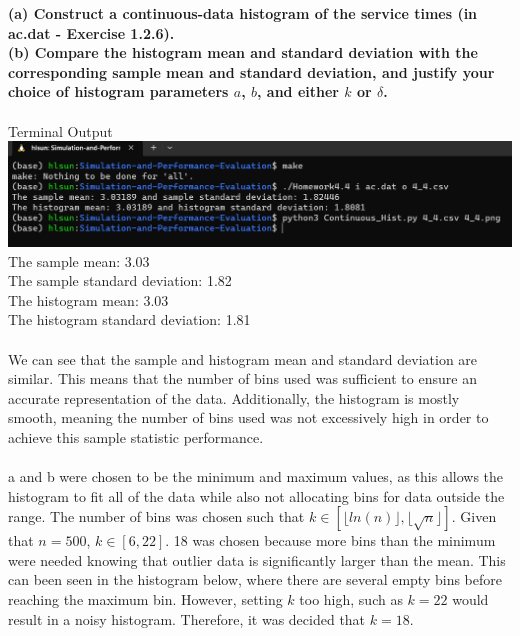 \textbf{(a) Construct a continuous-data histogram of the service times (in ac.dat - Exercise 1.2.6).\\
(b) Compare the histogram mean and standard deviation with the corresponding sample mean and standard deviation, and justify your choice of histogram parameters $a$, $b$, and either $k$ or $\delta$.}\\\\
\noindent Terminal Output\\
\includegraphics[scale=0.6]{Sections/Q4/4_4_terminal.png}\\

\noindent The sample mean: 3.03\\
The sample standard deviation: 1.82\\
The histogram mean: 3.03\\
The histogram standard deviation: 1.81\\\\

\noindent We can see that the sample and histogram mean and standard deviation are similar. This means that the number of bins used was sufficient to ensure an accurate representation of the data. Additionally, the histogram is mostly smooth, meaning the number of bins used was not excessively high in order to achieve this sample statistic performance. \\\\

\noindent a and b were chosen to be the minimum and maximum values, as this allows the histogram to fit all of the data while also not allocating bins for data outside the range. The number of bins was chosen such that $k \in [\lfloor ln(n) \rfloor, \lfloor\sqrt{n}\rfloor]$. Given that $n = 500$, $k \in [6,22]$. 18 was chosen because more bins than the minimum were needed knowing that outlier data is significantly larger than the mean. This can been seen in the histogram below, where there are several empty bins before reaching the maximum bin. However, setting $k$ too high, such as $k=22$ would result in a noisy histogram. Therefore, it was decided that $k=18$.\\\\

